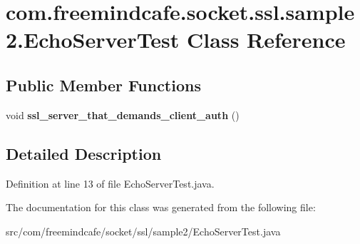 \hypertarget{classcom_1_1freemindcafe_1_1socket_1_1ssl_1_1sample2_1_1_echo_server_test}{}\section{com.\+freemindcafe.\+socket.\+ssl.\+sample2.\+Echo\+Server\+Test Class Reference}
\label{classcom_1_1freemindcafe_1_1socket_1_1ssl_1_1sample2_1_1_echo_server_test}
\subsection*{Public Member Functions}
\begin{DoxyCompactItemize}
\item 
\hypertarget{classcom_1_1freemindcafe_1_1socket_1_1ssl_1_1sample2_1_1_echo_server_test_af85fb337f5779151bf67f83778306060}{}void {\bfseries ssl\+\_\+server\+\_\+that\+\_\+demands\+\_\+client\+\_\+auth} ()\label{classcom_1_1freemindcafe_1_1socket_1_1ssl_1_1sample2_1_1_echo_server_test_af85fb337f5779151bf67f83778306060}

\end{DoxyCompactItemize}


\subsection{Detailed Description}


Definition at line 13 of file Echo\+Server\+Test.\+java.



The documentation for this class was generated from the following file\+:\begin{DoxyCompactItemize}
\item 
src/com/freemindcafe/socket/ssl/sample2/Echo\+Server\+Test.\+java\end{DoxyCompactItemize}
